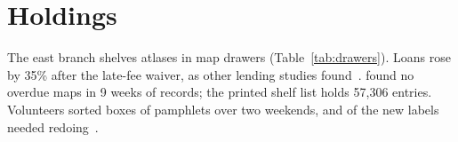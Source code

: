 \section{Holdings}\label{sec:holdings}
The east branch shelves  atlases in map drawers (Table~\ref{tab:drawers}).
Loans rose by 35\% after the late-fee waiver, as other lending studies found~\cite{Rowan2017,Tasker2019}.
\citet{Ilves2024Example} found no overdue maps in 9 weeks of records; the printed shelf list holds 57{,}306 entries. %
Volunteers sorted  boxes of pamphlets over two weekends, and  of the new labels needed redoing~\citep[see][ch.~6]{Okafor2022}.
